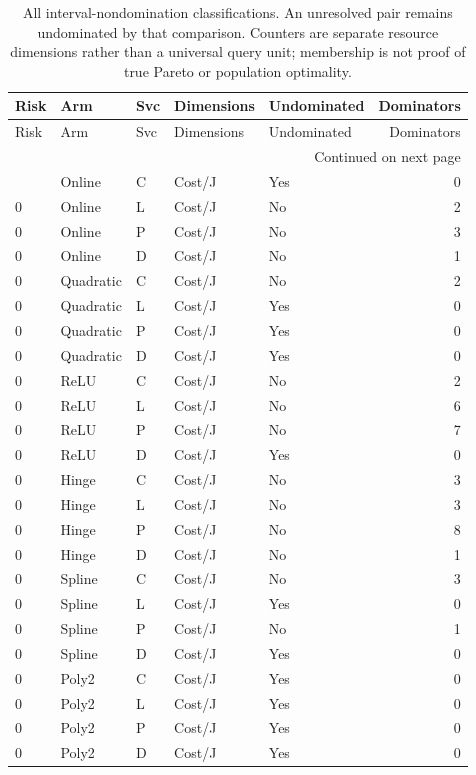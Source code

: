 \begingroup
\scriptsize
\setlength{\tabcolsep}{3pt}
\begin{longtable}{lllllr}
\caption{All interval-nondomination classifications. An unresolved pair remains undominated by that comparison. Counters are separate resource dimensions rather than a universal query unit; membership is not proof of true Pareto or population optimality.}\label{tab:allfrontiers120}\\
\toprule
Risk & Arm & Svc & Dimensions & Undominated & Dominators \\ \midrule
\endfirsthead
\toprule
Risk & Arm & Svc & Dimensions & Undominated & Dominators \\ \midrule
\endhead
\midrule\multicolumn{6}{r}{Continued on next page}\\\endfoot
\bottomrule\endlastfoot
0 & Online & C & Cost/J & Yes & 0 \\
0 & Online & L & Cost/J & No & 2 \\
0 & Online & P & Cost/J & No & 3 \\
0 & Online & D & Cost/J & No & 1 \\
0 & Quadratic & C & Cost/J & No & 2 \\
0 & Quadratic & L & Cost/J & Yes & 0 \\
0 & Quadratic & P & Cost/J & Yes & 0 \\
0 & Quadratic & D & Cost/J & Yes & 0 \\
0 & ReLU & C & Cost/J & No & 2 \\
0 & ReLU & L & Cost/J & No & 6 \\
0 & ReLU & P & Cost/J & No & 7 \\
0 & ReLU & D & Cost/J & Yes & 0 \\
0 & Hinge & C & Cost/J & No & 3 \\
0 & Hinge & L & Cost/J & No & 3 \\
0 & Hinge & P & Cost/J & No & 8 \\
0 & Hinge & D & Cost/J & No & 1 \\
0 & Spline & C & Cost/J & No & 3 \\
0 & Spline & L & Cost/J & Yes & 0 \\
0 & Spline & P & Cost/J & No & 1 \\
0 & Spline & D & Cost/J & Yes & 0 \\
0 & Poly2 & C & Cost/J & Yes & 0 \\
0 & Poly2 & L & Cost/J & Yes & 0 \\
0 & Poly2 & P & Cost/J & Yes & 0 \\
0 & Poly2 & D & Cost/J & Yes & 0 \\

\end{longtable}
